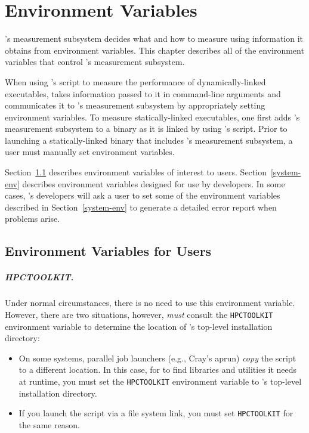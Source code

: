 \newcommand{\parg}{\vspace{1ex}\noindent}

\chapter{Environment Variables}

\HPCToolkit{}'s measurement subsystem decides what and how to measure
using information it obtains from environment variables.  
This chapter describes all of the environment variables that control
\HPCToolkit's measurement subsystem. 

When using
\HPCToolkit{}'s \hpcrun{} script to measure the performance of
dynamically-linked executables, \hpcrun{} takes information passed
to it in command-line arguments and communicates it to \HPCToolkit{}'s
measurement subsystem by appropriately setting environment variables.
To measure statically-linked executables, one first adds \HPCToolkit's
measurement subsystem to a binary as it is linked by using \HPCToolkit's
\hpclink{} script. Prior to launching a statically-linked binary that
includes \HPCToolkit's measurement subsystem, a user 
must manually set environment variables.

Section~\ref{user-env} describes
environment variables of interest to users. Section~\ref{system-env}
describes environment variables designed for use by \HPCToolkit{}
developers. In some cases, \HPCToolkit's developers will ask a user
to set some of the environment variables described in Section~\ref{system-env} to generate a detailed error 
report when problems arise.

\section{Environment Variables for Users}
\label{user-env}

\paragraph{HPCTOOLKIT.}
Under normal circumstances, there is no need to use this environment variable. 
However, there are two situations, however, \hpcrun{}
\emph{must} consult the \verb+HPCTOOLKIT+ environment variable to determine the location
of \HPCToolkit{}'s top-level installation directory:

\begin{itemize}
\item On some systems, parallel job launchers (e.g., Cray's aprun) \emph{copy} the
       \hpcrun{} script to a different location. In this case, for \hpcrun{} to find libraries
       and utilities it needs at runtime, you must set the \verb+HPCTOOLKIT+ environment variable to 
       \HPCToolkit{}'s top-level installation directory.
\item
       If you launch the \hpcrun{} script via a file system link,
       you must set \verb+HPCTOOLKIT+ for the same reason.
\end{itemize}


